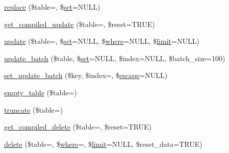 \begin{DoxyCompactItemize}
\item 
\mbox{\hyperlink{class_c_i___d_b__query__builder_a68fb988ea9168f22669d3fba960f3555}{replace}} (\$table=\textquotesingle{}\textquotesingle{}, \$\mbox{\hyperlink{class_c_i___d_b__query__builder_ac895a54db4870f128d0ef2426e4c282f}{set}}=N\+U\+LL)
\item 
\mbox{\hyperlink{class_c_i___d_b__query__builder_a6fa661dc20fa2a32413aef4d38c198aa}{get\+\_\+compiled\+\_\+update}} (\$table=\textquotesingle{}\textquotesingle{}, \$reset=T\+R\+UE)
\item 
\mbox{\hyperlink{class_c_i___d_b__query__builder_a396216c9f58d8b98ae09faf00f0203f1}{update}} (\$table=\textquotesingle{}\textquotesingle{}, \$\mbox{\hyperlink{class_c_i___d_b__query__builder_ac895a54db4870f128d0ef2426e4c282f}{set}}=N\+U\+LL, \$\mbox{\hyperlink{class_c_i___d_b__query__builder_ac72023dbd400394f3a2f46c5df578713}{where}}=N\+U\+LL, \$\mbox{\hyperlink{class_c_i___d_b__query__builder_a1b72e2941924e573f5efb95f8dbc9815}{limit}}=N\+U\+LL)
\item 
\mbox{\hyperlink{class_c_i___d_b__query__builder_aeb16ba65c9f768f47f5a3f2864a6d293}{update\+\_\+batch}} (\$table, \$\mbox{\hyperlink{class_c_i___d_b__query__builder_ac895a54db4870f128d0ef2426e4c282f}{set}}=N\+U\+LL, \$index=N\+U\+LL, \$batch\+\_\+size=100)
\item 
\mbox{\hyperlink{class_c_i___d_b__query__builder_a4bceb3a5210b3c9ede51132cacb1e47c}{set\+\_\+update\+\_\+batch}} (\$key, \$index=\textquotesingle{}\textquotesingle{}, \$\mbox{\hyperlink{class_c_i___d_b__driver_a75beb60cdd3ee1875646d729963f5f5f}{escape}}=N\+U\+LL)
\item 
\mbox{\hyperlink{class_c_i___d_b__query__builder_a6823e3af5bf02510ed025efb607a967c}{empty\+\_\+table}} (\$table=\textquotesingle{}\textquotesingle{})
\item 
\mbox{\hyperlink{class_c_i___d_b__query__builder_a6fb8a3114ae1460cd9ecf4a328812d31}{truncate}} (\$table=\textquotesingle{}\textquotesingle{})
\item 
\mbox{\hyperlink{class_c_i___d_b__query__builder_af9c2c3c575153f5adcf76e16e172b448}{get\+\_\+compiled\+\_\+delete}} (\$table=\textquotesingle{}\textquotesingle{}, \$reset=T\+R\+UE)
\item 
\mbox{\hyperlink{class_c_i___d_b__query__builder_a3e4caf438a69a05c96adedb2cb050d5f}{delete}} (\$table=\textquotesingle{}\textquotesingle{}, \$\mbox{\hyperlink{class_c_i___d_b__query__builder_ac72023dbd400394f3a2f46c5df578713}{where}}=\textquotesingle{}\textquotesingle{}, \$\mbox{\hyperlink{class_c_i___d_b__query__builder_a1b72e2941924e573f5efb95f8dbc9815}{limit}}=N\+U\+LL, \$reset\+\_\+data=T\+R\+UE)

\end{DoxyCompactItemize}
